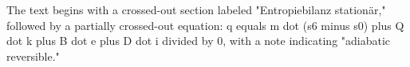 The text begins with a crossed-out section labeled "Entropiebilanz stationär," followed by a partially crossed-out equation: q equals m dot (s6 minus s0) plus Q dot k plus B dot e plus D dot i divided by 0, with a note indicating "adiabatic reversible."